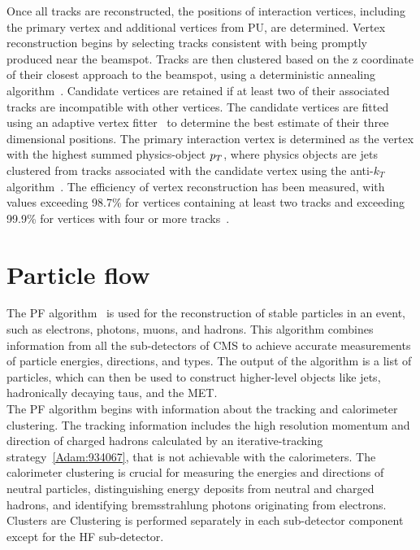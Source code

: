 Once all tracks are reconstructed, the positions of interaction vertices, including the primary vertex and additional vertices from \ac{PU}, are determined. 
Vertex reconstruction begins by selecting tracks consistent with being promptly produced near the beamspot. 
Tracks are then clustered based on the z coordinate of their closest approach to the beamspot, using a deterministic annealing algorithm~\cite{Rose:1998dzq}. 
Candidate vertices are retained if at least two of their associated tracks are incompatible with other vertices. 
The candidate vertices are fitted using an adaptive vertex fitter~\cite{Fruhwirth:2007hz} to determine the best estimate of their three dimensional positions. 
The primary interaction vertex is determined as the vertex with the highest summed physics-object $p_{T}$, where physics objects are jets clustered from tracks associated with the candidate vertex using the anti-$k_T$ algorithm~\cite{Fruhwirth:2007hz}.
The efficiency of vertex reconstruction has been measured, with values exceeding 98.7\% for vertices containing at least two tracks and exceeding 99.9\% for vertices with four or more tracks~\cite{CMS:2010mua}. 

\section{Particle flow}

The \ac{PF} algorithm~\cite{PF_CMS,CMS:2010byl,CMS:2010eua} is used for the reconstruction of stable particles in an event, such as electrons, photons, muons, and hadrons. 
This algorithm combines information from all the sub-detectors of \ac{CMS} to achieve accurate measurements of particle energies, directions, and types. 
The output of the algorithm is a list of particles, which can then be used to construct higher-level objects like jets, hadronically decaying taus, and the \ac{MET}.\\

The \ac{PF} algorithm begins with information about the tracking and calorimeter clustering.
The tracking information includes the high resolution momentum and direction of charged hadrons calculated by an iterative-tracking strategy~\ref{Adam:934067}, that is not achievable with the calorimeters.
The calorimeter clustering is crucial for measuring the energies and directions of neutral particles, distinguishing energy deposits from neutral and charged hadrons, and identifying bremsstrahlung photons originating from electrons.
Clusters are 
Clustering is performed separately in each sub-detector component except for the \ac{HF} sub-detector. \\

